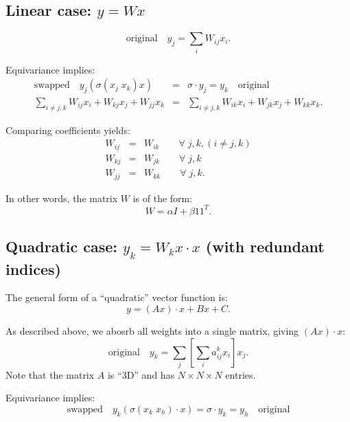\subsection{Linear case: $y = W x$}

\begin{equation}
\boxed{\mbox{original}} \quad y_j = \sum_i W_{ij} x_i .
\end{equation}

Equivariance implies:
\begin{eqnarray}
\boxed{\mbox{swapped}} \quad y_j ( \sigma(x_j \; x_k) x) &=& \sigma \cdot y_j = y_k \quad \boxed{\mbox{original}} \\
\sum_{i \neq j,k} W_{ij} x_i + W_{kj} x_j + W_{jj} x_k &=& \sum_{i \neq j,k} W_{ik} x_i + W_{jk} x_j + W_{kk} x_k . \nonumber
\end{eqnarray}


Comparing coefficients yields:
\begin{eqnarray}
W_{ij} &=& W_{ik} \quad \quad \forall \; j, k, (i \neq j, k) \nonumber \\
W_{kj} &=& W_{jk} \quad \quad \forall \; j, k \nonumber \\
W_{jj} &=& W_{kk} \quad \quad \forall \; j, k .
\end{eqnarray}

In other words, the matrix $W$ is of the form:
\begin{equation}
W = \alpha I + \beta 1 1^T .
\end{equation}

\subsection{Quadratic case: $y_k = W_k x \cdot x$ (with redundant indices)}

The general form of a ``quadratic'' vector function is:
\begin{equation}
y = (A x) \cdot x + B x + C .
\end{equation}

As described above, we abosrb all weights into a single matrix, giving $(A x) \cdot x$:
\begin{equation}
\boxed{\mbox{original}} \quad y_k = \sum_j \left[ \sum_i a_{ij}^k x_i \right] x_j .
\end{equation}
Note that the matrix $A$ is ``3D'' and has $N \times N \times N$ entries.

Equivariance implies:
\begin{equation}
\boxed{\mbox{swapped}} \quad y_k ( \sigma(x_k \; x_h) \cdot x) = \sigma \cdot y_k = y_h \quad \boxed{\mbox{original}}
\end{equation}

